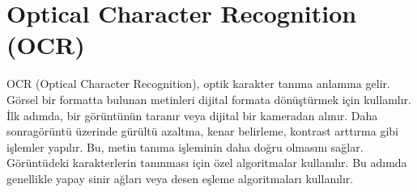\section{Optical Character Recognition (OCR)}
OCR (Optical Character Recognition), optik karakter tanıma anlamına gelir. Görsel bir formatta bulunan metinleri dijital formata dönüştürmek için kullanılır. İlk adımda, bir görüntünün taranır veya dijital bir kameradan alınır. Daha sonragörüntü üzerinde gürültü azaltma, kenar belirleme, kontrast arttırma gibi işlemler yapılır. Bu, metin tanıma işleminin daha doğru olmasını sağlar. Görüntüdeki karakterlerin tanınması için özel algoritmalar kullanılır. Bu adımda genellikle yapay sinir ağları veya desen eşleme algoritmaları kullanılır.

\newpage